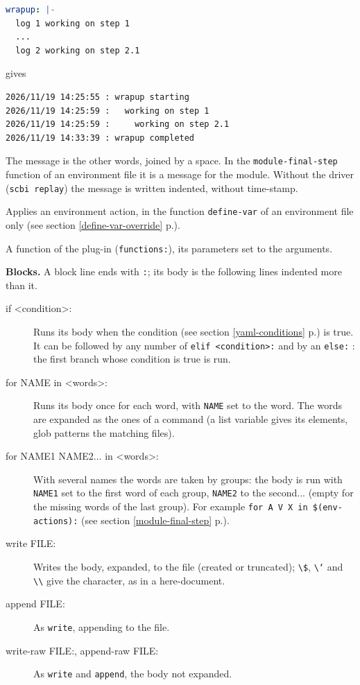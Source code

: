 \documentclass[a4paper,12pt,twoside]{article}
\newcommand{\code}[1]{\texttt{#1}}
\newcommand{\seeref}[1]{see section \ref{#1} p.\pageref{#1}}
\begin{document}
\begin{description}
\begin{lstlisting}[language=yaml]
wrapup: |-
  log 1 working on step 1
  ...
  log 2 working on step 2.1
\end{lstlisting}

	gives

\begin{lstlisting}
2026/11/19 14:25:55 : wrapup starting
2026/11/19 14:25:59 :   working on step 1
2026/11/19 14:25:59 :     working on step 2.1
2026/11/19 14:33:39 : wrapup completed
\end{lstlisting}

	The message is the other words, joined by a space. In the
	\code{module-final-step} function of an environment file it is a
	message for the module. Without the driver (\code{scbi replay}) the
	message is written indented, without time-stamp.
	\item[apply-var <action> <variable> {[<value>]}] Applies an environment
	action, in the function \code{define-var} of an environment file only
	(\seeref{define-var-override}).
	\item[<function> <args>] A function of the plug-in (\code{functions:}),
	its parameters set to the arguments.
\end{description}

\textbf{Blocks.} 
A block line ends with \code{:}; its body is the following lines indented
more than it.

\begin{description}
	\item[if <condition>:] Runs its body when the condition
	(\seeref{yaml-conditions}) is true. It can be followed by any number of
	\code{elif <condition>:} and by an \code{else:} : the first branch whose
	condition is true is run.
	\item[for NAME in <words>:] Runs its body once for each word, with
	\code{NAME} set to the word. The words are expanded as the ones of a
	command (a list variable gives its elements, glob patterns the matching
	files).
	\item[for NAME1 NAME2... in <words>:] With several names the words are
	taken by groups: the body is run with \code{NAME1} set to the first word
	of each group, \code{NAME2} to the second... (empty for the missing words
	of the last group). For example \code{for A V X in \$(env-actions):}
	(\seeref{module-final-step}).
	\item[write FILE:] Writes the body, expanded, to the file (created or
	truncated); \code{\textbackslash\$}, \code{\textbackslash`} and
	\code{\textbackslash\textbackslash} give the character, as in a
	here-document.
	\item[append FILE:] As \code{write}, appending to the file.
	\item[write-raw FILE:, append-raw FILE:] As \code{write} and
	\code{append}, the body not expanded.
\end{description}
\end{document}
